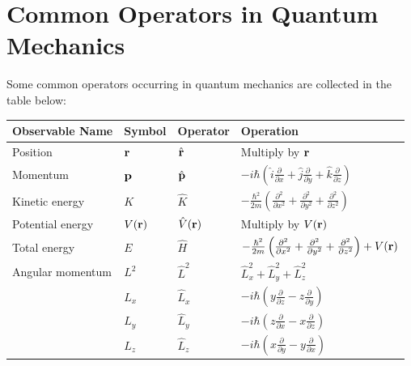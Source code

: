 \documentclass[
  english,
  9pt,
]{extbook}
\newcounter{none} %
\theoremstyle{definition}
\theoremstyle{definition}
\theoremstyle{definition}
\theoremstyle{definition}
\theoremstyle{remark}
\begin{document}
\section{Common Operators in Quantum Mechanics}\label{common-operators-in-quantum-mechanics}

Some common operators occurring in quantum mechanics are collected in the table below:

\tiny

{\def\LTcaptype{none} %
\begin{longtable}[]{@{}
  >{\raggedright\arraybackslash}p{}
  >{\centering\arraybackslash}p{}
  >{\centering\arraybackslash}p{}
  >{\raggedright\arraybackslash}p{}@{}}
\toprule\noalign{}
\begin{minipage}[b]{\linewidth}\raggedright
Observable Name
\end{minipage} & \begin{minipage}[b]{\linewidth}\centering
Symbol
\end{minipage} & \begin{minipage}[b]{\linewidth}\centering
Operator
\end{minipage} & \begin{minipage}[b]{\linewidth}\raggedright
Operation
\end{minipage} \\
\midrule\noalign{}
\endhead
\bottomrule\noalign{}
\endlastfoot
Position & \({\bf r}\) & \(\hat{\bf r}\) & Multiply by \({\bf r}\) \\
Momentum & \({\bf p}\) & \(\hat{\bf p}\) & \(-i \hbar \left(\hat{i}\frac{\partial}{\partial x} +\hat{j} \frac{\partial}{\partial y}+\hat{k} \frac{\partial}{\partial z} \right)\) \\
Kinetic energy & \(K\) & \(\hat{K}\) & \(- \frac{\hbar^2}{2m} \left(\frac{\partial^2}{\partial x^2} +\frac{\partial^2}{\partial y^2} +\frac{\partial^2}{\partial z^2} \right)\) \\
Potential energy & \(V({\bf r})\) & \(\hat{V}({\bf r})\) & Multiply by \(V({\bf r})\) \\
Total energy & \(E\) & \(\hat{H}\) & \(-\frac{\hbar^2}{2m} \left(\frac{\partial^2}{\partial x^2} +\frac{\partial^2}{\partial y^2} +\frac{\partial^2}{\partial z^2} \right) +V({\bf r})\) \\
Angular momentum & \(L^2\) & \(\hat{L}^2\) & \(\hat{L}_x^2+\hat{L}_y^2+\hat{L}_z^2\) \\
& \(L_x\) & \(\hat{L}_x\) & \(-i\hbar\left(y\frac{\partial}{\partial z} - z \frac{\partial}{\partial y} \right)\) \\
& \(L_y\) & \(\hat{L}_y\) & \(-i \hbar \left(z\frac{\partial}{\partial x} - x \frac{\partial}{\partial z} \right)\) \\
& \(L_z\) & \(\hat{L}_z\) & \(-i \hbar \left(x\frac{\partial}{\partial y} - y \frac{\partial}{\partial x} \right)\) \\
\end{longtable}
}
\end{document}
